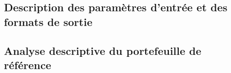     \subsection{Description des paramètres d'entrée et des formats de sortie}
    \subsection{Analyse descriptive du portefeuille de référence}











